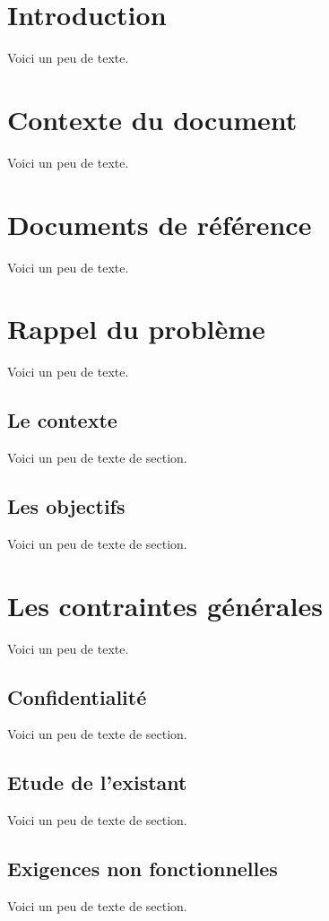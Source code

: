 

    \maketitle
    \tableofcontents
    

    \chapter{Introduction}
    Voici un peu de texte.
    
    \chapter{Contexte du document}
    Voici un peu de texte.
    
    \chapter{Documents de référence}
    Voici un peu de texte.
    
    \chapter{Rappel du problème}
    Voici un peu de texte.
    \section{Le contexte}
    Voici un peu de texte de section.
    \section{Les objectifs}
    Voici un peu de texte de section.
    
    \chapter{Les contraintes générales}
    Voici un peu de texte.
    \section{Confidentialité}
    Voici un peu de texte de section.
    \section{Etude de l'existant}
    Voici un peu de texte de section.
    \section{Exigences non fonctionnelles}
    Voici un peu de texte de section.
    
